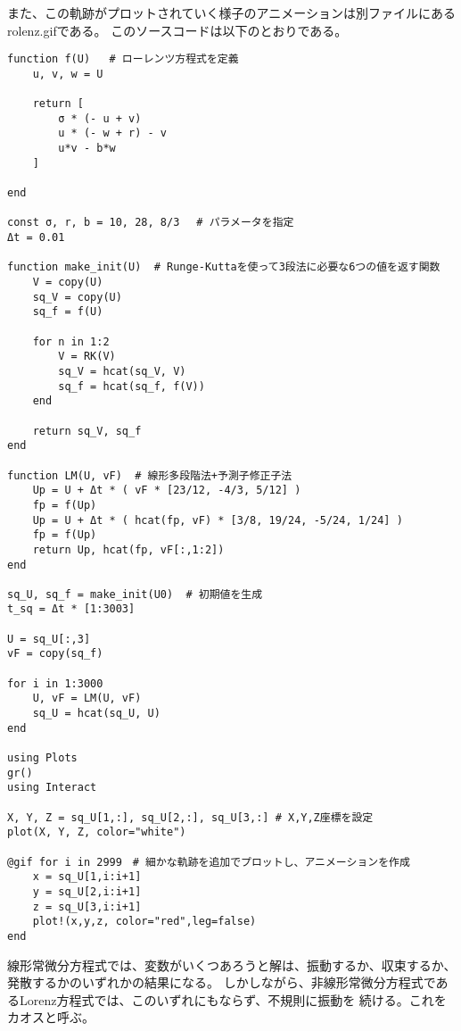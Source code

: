 \documentclass[12pt]{ltjsarticle}
\begin{document}
また、この軌跡がプロットされていく様子のアニメーションは別ファイルにあるrolenz.gifである。
このソースコードは以下のとおりである。
\begin{lstlisting}[basicstyle=\ttfamily\footnotesize, frame=single]
function f(U)   # ローレンツ方程式を定義
    u, v, w = U
    
    return [
        σ * (- u + v)
        u * (- w + r) - v
        u*v - b*w
    ]
    
end

const σ, r, b = 10, 28, 8/3 　# パラメータを指定
Δt = 0.01

function make_init(U)  # Runge-Kuttaを使って3段法に必要な6つの値を返す関数
    V = copy(U) 
    sq_V = copy(U)
    sq_f = f(U)
    
    for n in 1:2
        V = RK(V)
        sq_V = hcat(sq_V, V)
        sq_f = hcat(sq_f, f(V))
    end
    
    return sq_V, sq_f
end

function LM(U, vF)  # 線形多段階法+予測子修正子法
    Up = U + Δt * ( vF * [23/12, -4/3, 5/12] )
    fp = f(Up)
    Up = U + Δt * ( hcat(fp, vF) * [3/8, 19/24, -5/24, 1/24] )
    fp = f(Up)
    return Up, hcat(fp, vF[:,1:2])
end

sq_U, sq_f = make_init(U0)  # 初期値を生成
t_sq = Δt * [1:3003]

U = sq_U[:,3]
vF = copy(sq_f)

for i in 1:3000
    U, vF = LM(U, vF)
    sq_U = hcat(sq_U, U)
end

using Plots
gr()
using Interact

X, Y, Z = sq_U[1,:], sq_U[2,:], sq_U[3,:] # X,Y,Z座標を設定
plot(X, Y, Z, color="white")

@gif for i in 2999　# 細かな軌跡を追加でプロットし、アニメーションを作成
    x = sq_U[1,i:i+1]
    y = sq_U[2,i:i+1]
    z = sq_U[3,i:i+1]
    plot!(x,y,z, color="red",leg=false)
end
    \end{lstlisting}

線形常微分方程式では、変数がいくつあろうと解は、振動するか、収束するか、発散するかのいずれかの結果になる。
しかしながら、非線形常微分方程式であるLorenz方程式では、このいずれにもならず、不規則に振動を
続ける。これをカオスと呼ぶ。
\end{document}
